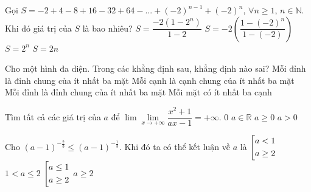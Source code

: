 \begin{ex}%
Gọi $S=-2+4-8+16-32+64-...+{\left(-2\right)}^{n-1}+{\left(-2\right)}^n$, $\forall n\ge 1$, $n\in \mathbb{N}$. Khi đó giá trị của $S$ là bao nhiêu?
\choice
{$S=\dfrac{-2\left(1-2^n\right)}{1-2}$}
{\True $S=-2\left(\dfrac{1-{\left(-2\right)}^n}{1-\left(-2\right)}\right)$}
{$S=2^n$}
{$S=2n$}
\end{ex}
\begin{ex}%
Cho một hình đa diện. Trong các khẳng định sau, khẳng định nào sai?
\choice
{Mỗi đỉnh là đỉnh chung của ít nhất ba mặt}
{\True Mỗi cạnh là cạnh chung của ít nhất ba mặt}
{Mỗi đỉnh là đỉnh chung của ít nhất ba mặt}
{Mỗi mặt có ít nhất ba cạnh}
\loigiai{
}
\end{ex}
\begin{ex}%
Tìm tất cả các giá trị của $a$ để
$\lim\lim\limits_{x\to+\infty}\dfrac{x^2+1}{ax-1}=+\infty$.
\choice
{$0$}
{$a\in \mathbb{R}$}
{$a\ge 0$}
{\True $a>0$}
\end{ex}
\begin{ex}%
Cho ${\left(a-1\right)}^{-\frac{2}{3}}\le {\left(a-1\right)}^{-\frac{1}{3}}$. Khi đó ta có thể kết luận về $a$ là
\choice
{$\left[\begin{aligned}
		& a<1 \\ 
		& a\ge 2 \\ \end{aligned}\right.$}
{$1<a\le 2$}
{$\left[\begin{aligned}& a\le 1 \\ 
		& a\ge 2 \\ \end{aligned}\right.$}
{\True $a\ge 2$}
\end{ex}
